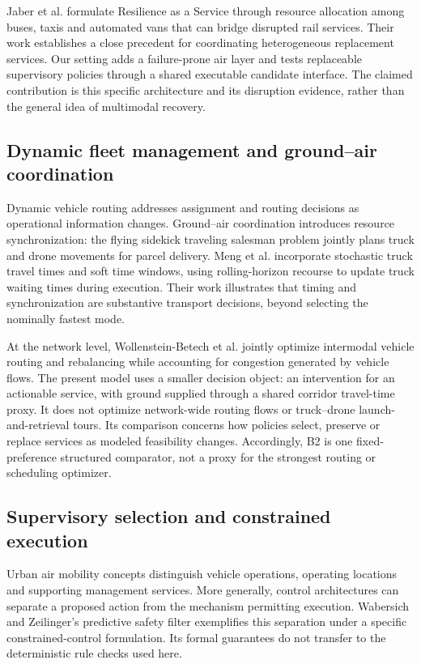 \documentclass[]{interact}
\theoremstyle{plain}
\theoremstyle{definition}
\theoremstyle{remark}
\begin{document}
Jaber et al. formulate Resilience as a Service through resource allocation among buses, taxis and automated vans that can bridge disrupted rail services. \citep{ref20} Their work establishes a close precedent for coordinating heterogeneous replacement services. Our setting adds a failure-prone air layer and tests replaceable supervisory policies through a shared executable candidate interface. The claimed contribution is this specific architecture and its disruption evidence, rather than the general idea of multimodal recovery.

\subsection{Dynamic fleet management and ground--air coordination}

Dynamic vehicle routing addresses assignment and routing decisions as operational information changes. \citep{ref4} Ground--air coordination introduces resource synchronization: the flying sidekick traveling salesman problem jointly plans truck and drone movements for parcel delivery. \citep{ref6} Meng et al. incorporate stochastic truck travel times and soft time windows, using rolling-horizon recourse to update truck waiting times during execution. \citep{ref21} Their work illustrates that timing and synchronization are substantive transport decisions, beyond selecting the nominally fastest mode.

At the network level, Wollenstein-Betech et al. jointly optimize intermodal vehicle routing and rebalancing while accounting for congestion generated by vehicle flows. \citep{ref22} The present model uses a smaller decision object: an intervention for an actionable service, with ground supplied through a shared corridor travel-time proxy. It does not optimize network-wide routing flows or truck--drone launch-and-retrieval tours. Its comparison concerns how policies select, preserve or replace services as modeled feasibility changes. Accordingly, B2 is one fixed-preference structured comparator, not a proxy for the strongest routing or scheduling optimizer.

\subsection{Supervisory selection and constrained execution}

Urban air mobility concepts distinguish vehicle operations, operating locations and supporting management services. \citep{ref7} More generally, control architectures can separate a proposed action from the mechanism permitting execution. Wabersich and Zeilinger's predictive safety filter exemplifies this separation under a specific constrained-control formulation. \citep{ref8} Its formal guarantees do not transfer to the deterministic rule checks used here.
\end{document}
